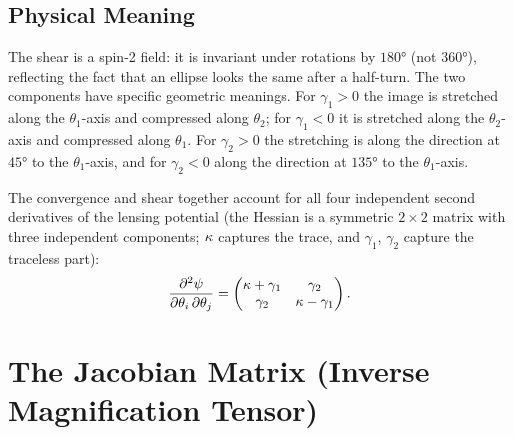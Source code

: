 \subsection{Physical Meaning}

The shear is a spin-2 field: it is invariant under rotations
by $180°$ (not $360°$), reflecting the fact that an ellipse looks
the same after a half-turn.  The two components have specific geometric
meanings.  For $\gamma_1 > 0$ the image is stretched along the
$\theta_1$-axis and compressed along $\theta_2$; for $\gamma_1 < 0$ it is
stretched along the $\theta_2$-axis and compressed along $\theta_1$.  For
$\gamma_2 > 0$ the stretching is along the direction at $45°$ to the
$\theta_1$-axis, and for $\gamma_2 < 0$ along the direction at $135°$ to
the $\theta_1$-axis.

\begin{remark}
The convergence and shear together account for all four independent
second derivatives of the lensing potential (the Hessian is a
symmetric $2 \times 2$ matrix with three independent components;
$\kappa$ captures the trace, and $\gamma_1$, $\gamma_2$ capture
the traceless part):
\begin{equation}
    \frac{\partial^2 \psi}{\partial\theta_i\,\partial\theta_j}
    = \begin{pmatrix}
    \kappa + \gamma_1 & \gamma_2 \\
    \gamma_2 & \kappa - \gamma_1
    \end{pmatrix} .
    \label{eq:hessian_decomposition}
\end{equation}
\end{remark}


\section{The Jacobian Matrix (Inverse Magnification Tensor)}
\label{sec:jacobian}

